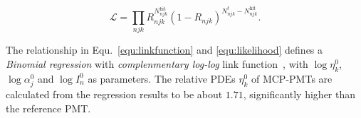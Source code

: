\begin{equation}
    \label{equ:likelihood}
    \mathcal{L}=\prod_{njk}{R_{njk}^{N^\mathrm{hit}_{njk}}(1-R_{njk})^{N^t_{njk}-N^{\mathrm{hit}}_{njk}}}.
\end{equation}

The relationship in Equ.~\eqref{equ:linkfunction} and \eqref{equ:likelihood} defines a \emph{Binomial regression} with \emph{complenmentary log-log} link function~\cite{glm}, with $\log{\eta_k^0}$, $\log{\alpha_j^0}$ and $\log{I_n^0}$ as parameters. The relative PDEs $\eta_k^0$ of MCP-PMTs are calculated from the regression results to be about $1.71$, significantly higher than the reference PMT.
